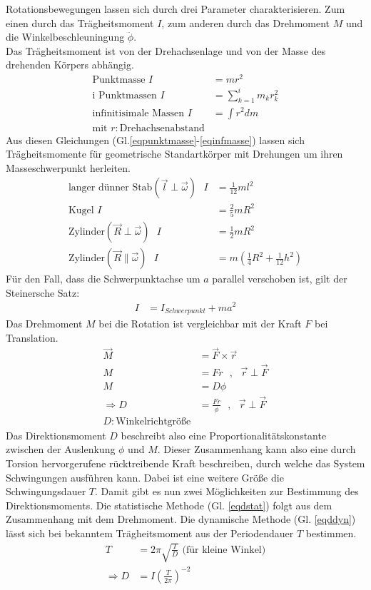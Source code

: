 Rotationsbewegungen lassen sich durch drei Parameter charakterisieren.
Zum einen durch das Trägheitsmoment $I$, zum anderen durch das Drehmoment $M$ und
die Winkelbeschleuningung $\ddot \phi$.\\
Das Trägheitsmoment ist von der Drehachsenlage und von der Masse des drehenden Körpers abhängig.
 \begin{align}
	\text{Punktmasse } I&=m r^2 \label{eqpunktmasse}\\
	\text{i Punktmassen } I&=\sum_{k=1}^i m_k r_k^2 \\
	\text{infinitisimale Massen } I&=\int r^2 dm \label{eqinfmasse}\\
	\text{mit } r: \text{Drehachsenabstand} \nonumber
 \end{align}
 Aus diesen Gleichungen (Gl.\ref{eqpunktmasse}-\ref{eqinfmasse}) lassen sich Trägheitsmomente
 für geometrische Standartkörper mit Drehungen um ihren Masseschwerpunkt herleiten.
 \begin{align}
	\text{langer dünner Stab}(\vec l \perp \vec \omega) \text{  } I&=\frac{1}{12} m l^2 \\
	\text{Kugel } I&=\frac{2}{5} m R^2 \\
	\text{Zylinder} (\vec R \perp \vec \omega) \text{  } I&=\frac{1}{2} m R^2 \\
	\text{Zylinder} (\vec R \| \vec \omega) \text{  } I&=m (\frac{1}{4} R^2 + \frac{1}{12} h^2)
 \end{align}
 Für den Fall, dass die Schwerpunktachse um $a$ parallel verschoben ist, gilt der Steinersche Satz:
 \begin{align}
	I&=I_{Schwerpunkt} + m a^2
 \end{align}
 Das Drehmoment $M$ bei die Rotation ist vergleichbar mit der Kraft $F$ bei Translation.
 \begin{align}
	\vec M &= \vec F \times \vec r \\
	M &= F  r\text{  },\text{  }\vec r \perp \vec F\\
	M&=D \phi\\
	\Rightarrow D&=\frac{F r}{\phi} \text{  },\text{  } \vec r \perp \vec F \label{eqdstat}\\
	D: \text{Winkelrichtgröße} \nonumber
 \end{align}
 Das Direktionsmoment $D$ beschreibt also eine Proportionalitätskonstante zwischen der
 Auslenkung $\phi$ und $M$. Dieser Zusammenhang kann also eine durch Torsion hervorgerufene
 rücktreibende Kraft beschreiben, durch welche das System Schwingungen ausführen kann.
 Dabei ist eine weitere Größe die Schwingungsdauer $T$. Damit gibt es nun zwei Möglichkeiten
 zur Bestimmung des Direktionsmoments. Die statistische Methode (Gl. \ref{eqdstat}) folgt aus dem 
 Zusammenhang mit dem Drehmoment. Die dynamische Methode (Gl. \ref{eqddyn}) lässt sich bei bekanntem
 Trägheitsmoment aus der Periodendauer $T$ bestimmen.
\begin{align}
	T&=2\pi\sqrt{\frac{I}{D}} \text{ (für kleine Winkel)}\\
	\Rightarrow D&=I(\frac{T}{2\pi})^{-2} \label{eqddyn}
\end{align} 
